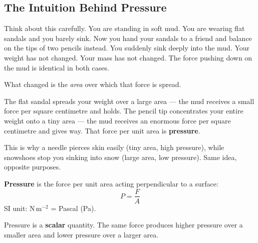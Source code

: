 \subsection{The Intuition Behind Pressure}

Think about this carefully. You are standing in soft
mud. You are wearing flat sandals and you barely sink.
Now you hand your sandals to a friend and balance on
the tips of two pencils instead. You suddenly sink
deeply into the mud. Your weight has not changed.
Your mass has not changed. The force pushing down on
the mud is identical in both cases.

What changed is the \textit{area} over which that
force is spread.

The flat sandal spreads your weight over a large area
--- the mud receives a small force per square centimetre
and holds. The pencil tip concentrates your entire
weight onto a tiny area --- the mud receives an enormous
force per square centimetre and gives way. That force
per unit area is \textbf{pressure}.

This is why a needle pierces skin easily (tiny area, high pressure),
while snowshoes stop you sinking into snow (large area, low pressure).
Same idea, opposite purposes.

\begin{definitionbox}[Pressure]
\textbf{Pressure} is the force per unit area acting
perpendicular to a surface:
\[
  P = \frac{F}{A}
\]
SI unit: N\,m$^{-2}$ = Pascal (Pa).

Pressure is a \textbf{scalar} quantity. The same force
produces higher pressure over a smaller area and lower
pressure over a larger area.
\end{definitionbox}

